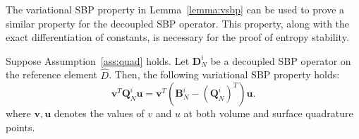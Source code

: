 \documentclass{svjour3}                     %
\renewcommand{\hat}{\widehat}
\newcommand{\LRp}[1]{\left( #1 \right)}
\newcommand{\LRl}[1]{\left. #1 \right|}
\renewcommand{\note}[1]{{\color{blue}{#1}}}
\begin{document}
The variational SBP property in Lemma~\ref{lemma:vsbp} can be used to prove a similar property for the decoupled SBP operator.  This property, along with the exact differentiation of constants, is necessary for the proof of entropy stability.  
\begin{lemma}
Suppose Assumption~\ref{ass:quad} holds.  Let $\bm{D}^i_N$ be a decoupled SBP operator on the reference element $\hat{D}$.  
Then, the following variational SBP property holds:
\[
\bm{v}^T\bm{Q}^i_N\bm{u} = \bm{v}^T\LRp{\bm{B}^i_N - \LRp{\bm{Q}^i_N}^T}\bm{u}.%
\]
where $\bm{v}, \bm{u}$ denotes the values of $v$ and $u$ at both volume and surface quadrature points.  
\label{lemma:vdsbp}
\end{lemma}
\end{document}
